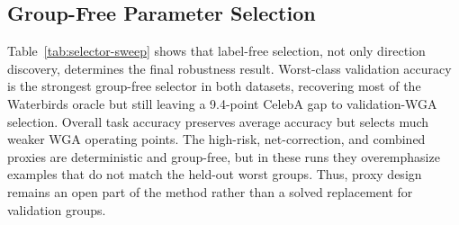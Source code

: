 \subsection{Group-Free Parameter Selection}
\begin{table}[t]
\centering
\caption{Rank-4 \textsc{LatentRisk-VLM} selection over the same candidate pool. All non-oracle selectors use validation task labels and frozen-baseline scores, but no group attributes. The oracle selector uses validation WGA and is included only as an upper bound.}
\label{tab:selector-sweep}
\footnotesize
\setlength{\tabcolsep}{3.2pt}
\end{table}

Table~\ref{tab:selector-sweep} shows that label-free selection, not only direction discovery, determines the final robustness result. Worst-class validation accuracy is the strongest group-free selector in both datasets, recovering most of the Waterbirds oracle but still leaving a 9.4-point CelebA gap to validation-WGA selection. Overall task accuracy preserves average accuracy but selects much weaker WGA operating points. The high-risk, net-correction, and combined proxies are deterministic and group-free, but in these runs they overemphasize examples that do not match the held-out worst groups. Thus, proxy design remains an open part of the method rather than a solved replacement for validation groups.

